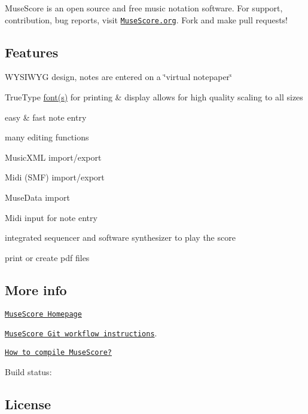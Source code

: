Muse\+Score is an open source and free music notation software. For support, contribution, bug reports, visit \href{https://musescore.org}{\tt Muse\+Score.\+org}. Fork and make pull requests!

\subsection*{Features}


\begin{DoxyItemize}
\item W\+Y\+S\+I\+W\+YG design, notes are entered on a \char`\"{}virtual notepaper\char`\"{}
\item True\+Type \hyperlink{structfont}{font(s)} for printing \& display allows for high quality scaling to all sizes
\item easy \& fast note entry
\item many editing functions
\item Music\+X\+ML import/export
\item Midi (S\+MF) import/export
\item Muse\+Data import
\item Midi input for note entry
\item integrated sequencer and software synthesizer to play the score
\item print or create pdf files
\end{DoxyItemize}

\subsection*{More info}


\begin{DoxyItemize}
\item \href{https://musescore.org}{\tt Muse\+Score Homepage}
\item \href{https://musescore.org/en/developers-handbook/git-workflow}{\tt Muse\+Score Git workflow instructions}.
\item \href{https://musescore.org/en/developers-handbook/compilation}{\tt How to compile Muse\+Score?}
\item Build status\+: \href{https://travis-ci.org/musescore/MuseScore}{\tt }
\end{DoxyItemize}

\subsection*{License}

